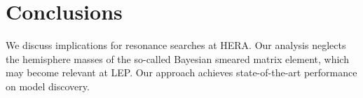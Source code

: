 \section{Conclusions}\label{sec:conclusions}

We discuss implications for resonance searches at HERA. Our analysis
neglects the hemisphere masses of the so-called Bayesian smeared matrix
element, which may become relevant at LEP. Our approach achieves
state-of-the-art performance on model discovery.

